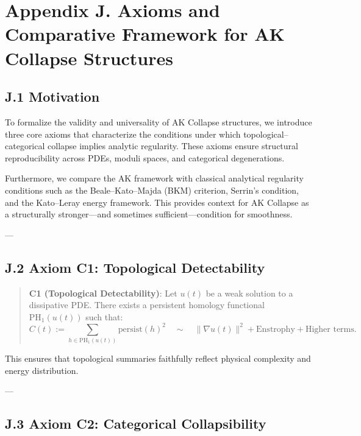 \documentclass[11pt]{article}
\theoremstyle{definition}
\begin{document}


\section*{Appendix J. Axioms and Comparative Framework for AK Collapse Structures}

\subsection*{J.1 Motivation}

To formalize the validity and universality of AK Collapse structures, we introduce three core axioms that characterize the conditions under which topological–categorical collapse implies analytic regularity.  
These axioms ensure structural reproducibility across PDEs, moduli spaces, and categorical degenerations.

Furthermore, we compare the AK framework with classical analytical regularity conditions such as the Beale--Kato--Majda (BKM) criterion, Serrin’s condition, and the Kato–Leray energy framework.  
This provides context for AK Collapse as a structurally stronger—and sometimes sufficient—condition for smoothness.

---

\subsection*{J.2 Axiom C1: Topological Detectability}

\begin{quote}
\textbf{C1 (Topological Detectability)}:  
Let \( u(t) \) be a weak solution to a dissipative PDE.  
There exists a persistent homology functional \( \mathrm{PH}_1(u(t)) \) such that:
\[
C(t) := \sum_{h \in \mathrm{PH}_1(u(t))} \mathrm{persist}(h)^2 \quad \sim \quad \|\nabla u(t)\|^2 + \text{Enstrophy} + \text{Higher terms}.
\]
\end{quote}

This ensures that topological summaries faithfully reflect physical complexity and energy distribution.

---

\subsection*{J.3 Axiom C2: Categorical Collapsibility}
\end{document}
